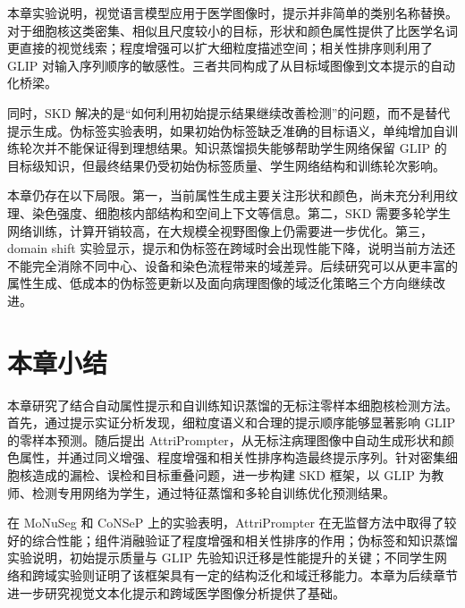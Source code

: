 本章实验说明，视觉语言模型应用于医学图像时，提示并非简单的类别名称替换。对于细胞核这类密集、相似且尺度较小的目标，形状和颜色属性提供了比医学名词更直接的视觉线索；程度增强可以扩大细粒度描述空间；相关性排序则利用了 GLIP 对输入序列顺序的敏感性。三者共同构成了从目标域图像到文本提示的自动化桥梁。

同时，SKD 解决的是“如何利用初始提示结果继续改善检测”的问题，而不是替代提示生成。伪标签实验表明，如果初始伪标签缺乏准确的目标语义，单纯增加自训练轮次并不能保证得到理想结果。知识蒸馏损失能够帮助学生网络保留 GLIP 的目标级知识，但最终结果仍受初始伪标签质量、学生网络结构和训练轮次影响。

本章仍存在以下局限。第一，当前属性生成主要关注形状和颜色，尚未充分利用纹理、染色强度、细胞核内部结构和空间上下文等信息。第二，SKD 需要多轮学生网络训练，计算开销较高，在大规模全视野图像上仍需要进一步优化。第三，domain shift 实验显示，提示和伪标签在跨域时会出现性能下降，说明当前方法还不能完全消除不同中心、设备和染色流程带来的域差异。后续研究可以从更丰富的属性生成、低成本的伪标签更新以及面向病理图像的域泛化策略三个方向继续改进。

\section{本章小结}

本章研究了结合自动属性提示和自训练知识蒸馏的无标注零样本细胞核检测方法。首先，通过提示实证分析发现，细粒度语义和合理的提示顺序能够显著影响 GLIP 的零样本预测。随后提出 AttriPrompter，从无标注病理图像中自动生成形状和颜色属性，并通过同义增强、程度增强和相关性排序构造最终提示序列。针对密集细胞核造成的漏检、误检和目标重叠问题，进一步构建 SKD 框架，以 GLIP 为教师、检测专用网络为学生，通过特征蒸馏和多轮自训练优化预测结果。

在 MoNuSeg 和 CoNSeP 上的实验表明，AttriPrompter 在无监督方法中取得了较好的综合性能；组件消融验证了程度增强和相关性排序的作用；伪标签和知识蒸馏实验说明，初始提示质量与 GLIP 先验知识迁移是性能提升的关键；不同学生网络和跨域实验则证明了该框架具有一定的结构泛化和域迁移能力。本章为后续章节进一步研究视觉文本化提示和跨域医学图像分析提供了基础。
